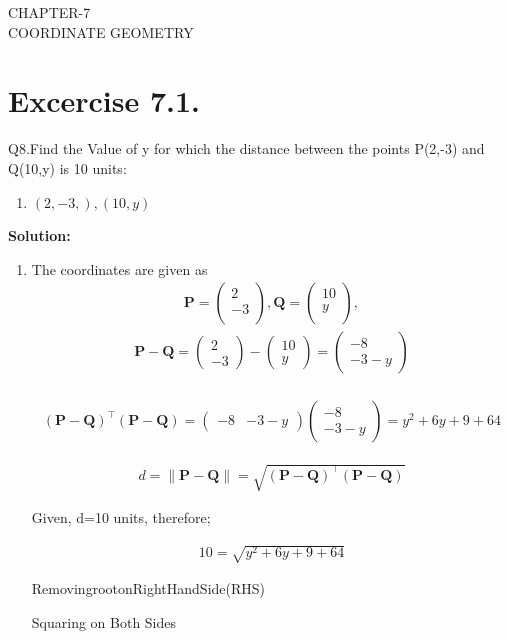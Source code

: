 \documentclass[12pt]{article}
\providecommand{\brak}[1]{\ensuremath{\left(#1\right)}}
\providecommand{\norm}[1]{\left\lVert#1\right\rVert}
\newcommand{\solution}{\noindent \textbf{Solution: }}
\newcommand{\myvec}[1]{\ensuremath{\begin{pmatrix}#1\end{pmatrix}}}
\let\vec\mathbf
\begin{document}
\begin{center}
\textbf\large{CHAPTER-7 \\ COORDINATE GEOMETRY}

\end{center}
\section*{Excercise 7.1.}

Q8.Find the Value of y for which the distance between the points P(2,-3) and Q(10,y) is 10 units:
\begin{enumerate}
	\item $\brak{2,-3,}, \brak{10,y}$ 
\end{enumerate}
\solution
\begin{enumerate}
\item The coordinates are given as
	\begin{align}
	\vec{P} = \myvec{
		2\\
	   -3\\
		},
	\vec{Q} = \myvec{
	   10\\
		y\\
		},
	\end{align}
	\begin{align}
		\vec{P} - \vec{Q} = \myvec{2\\-3} - \myvec{10\\y} = \myvec{-8\\-3-y}\\		
	\end{align}
	
	
	
	
	\begin{align}
			(\vec{P}-\vec{Q})^\top (\vec{P}-\vec{Q}) = \myvec{-8&-3-y} \myvec{-8\\-3-y} = y^2+6y+9+64
	\end{align}
	
	
	\begin{align}
	d={\norm{\vec{P}-\vec{Q}}}=\sqrt{\brak{\vec{P} -\vec{Q}}^{\top}\brak{\vec{P} -\vec{Q}}}
	\end{align}
	
	
    Given, d=10 units, therefore;
    
    
	\begin{align}
	10 = \sqrt{y^2+6y+9+64}
	\end{align}
	
	
	Removing\:root\:on\:Right\:Hand\:Side(RHS)
	
	Squaring on Both Sides
	

\end{enumerate}
\end{document}
